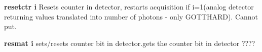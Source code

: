 \begin{DoxyItemize}
\item {\bfseries resetctr i } Resets counter in detector, restarts acquisition if i=1(analog detector returning values translated into number of photons -\/ only GOTTHARD). Cannot put.
\end{DoxyItemize}


\begin{DoxyItemize}
\item {\bfseries resmat i } sets/resets counter bit in detector.gets the counter bit in detector ???? 
\end{DoxyItemize}